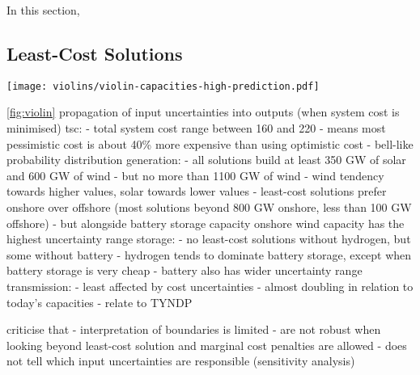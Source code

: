 In this section,

\subsection{Least-Cost Solutions}

\begin{SCfigure}
    \texttt{[image: violins/violin-capacities-high-prediction.pdf]}
    \caption{Lorem ipsum dolor sit amet, consetetur sadipscing elitr, sed diam nonumy eirmod tempor invidunt ut labore et dolore magna aliquyam erat, sed diam voluptua.}
    \label{fig:violin}
\end{SCfigure}

\cref{fig:violin}
propagation of input uncertainties into outputs (when system cost is minimised)
tsc:
- total system cost range between 160 and 220
- means most pessimistic cost is about 40\% more expensive than using optimistic cost
- bell-like probability distribution
generation:
- all solutions build at least 350 GW of solar and 600 GW of wind
- but no more than 1100 GW of wind
- wind tendency towards higher values, solar towards lower values
- least-cost solutions prefer onshore over offshore (most solutions beyond 800 GW onshore, less than 100 GW offshore)
- but alongside battery storage capacity onshore wind capacity has the highest uncertainty range
storage:
- no least-cost solutions without hydrogen, but some without battery
- hydrogen tends to dominate battery storage, except when battery storage is very cheap
- battery also has wider uncertainty range
transmission:
- least affected by cost uncertainties
- almost doubling in relation to today's capacities
- relate to TYNDP

criticise that
- interpretation of boundaries is limited
- are not robust when looking beyond least-cost solution and marginal cost penalties are allowed
- does not tell which input uncertainties are responsible (sensitivity analysis)


